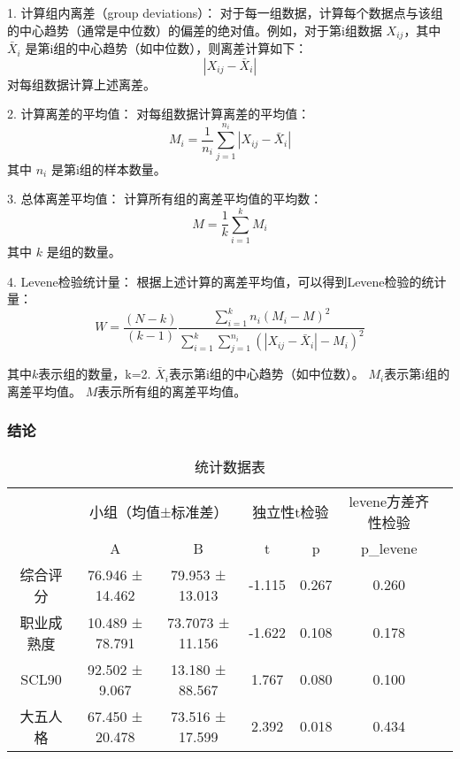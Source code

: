 \documentclass[withoutpreface,bwprint]{cumcmthesis} %
\begin{document}
1. 计算组内离差（group deviations）：
   对于每一组数据，计算每个数据点与该组的中心趋势（通常是中位数）的偏差的绝对值。例如，对于第i组数据 \( X_{ij} \)，其中 \( \bar{X}_i \) 是第i组的中心趋势（如中位数），则离差计算如下：
   \[
   |X_{ij} - \bar{X}_i|
   \]
   对每组数据计算上述离差。

2. 计算离差的平均值：
   对每组数据计算离差的平均值：
   \[
   M_i = \frac{1}{n_i} \sum_{j=1}^{n_i} |X_{ij} - \bar{X}_i|
   \]
   其中 \( n_i \) 是第i组的样本数量。

3. 总体离差平均值：
   计算所有组的离差平均值的平均数：
   \[
   M = \frac{1}{k} \sum_{i=1}^{k} M_i
   \]
   其中 \( k \) 是组的数量。

4. Levene检验统计量：
   根据上述计算的离差平均值，可以得到Levene检验的统计量：
\begin{equation}
    W = \frac{(N-k)}{(k-1)} \frac{\sum_{i=1}^{k} n_i (M_i - M)^2}{\sum_{i=1}^{k} \sum_{j=1}^{n_i} (|X_{ij} - \bar{X}_i| - M_i)^2}
\label{eq:Levene}
\end{equation}


其中\( k \)表示组的数量，k=2.
\( \bar{X}_i \)表示第i组的中心趋势（如中位数）。
\( M_i \)表示第i组的离差平均值。
\( M \)表示所有组的离差平均值。



\subsubsection{结论}

\begin{table}[h]
    \centering
    \begin{tabular}{ccccccc}
        \toprule
        & \multicolumn{2}{c}{小组（均值±标准差）} & \multicolumn{2}{c}{独立性t检验} & \multicolumn{1}{c}{levene方差齐性检验} \\ 
        \cmidrule(lr){2-3} \cmidrule(lr){4-5} \cmidrule(lr){6-6}
        & A & B & t & p & p\_levene \\ \midrule
        综合评分 & 76.946 ± 14.462 & 79.953 ± 13.013 & -1.115 & 0.267 & 0.260 \\ 
        职业成熟度 & 10.489 ± 78.791 & 73.7073 ± 11.156 & -1.622 & 0.108 & 0.178 \\ 
        SCL90 & 92.502 ± 9.067 & 13.180 ± 88.567 & 1.767 & 0.080 & 0.100 \\ 
        大五人格 & 67.450 ± 20.478 & 73.516 ± 17.599 & 2.392 & 0.018 & 0.434 \\ \bottomrule
    \end{tabular}
    \caption{统计数据表}
    \label{tab:statistics}
\end{table}
\end{document}
